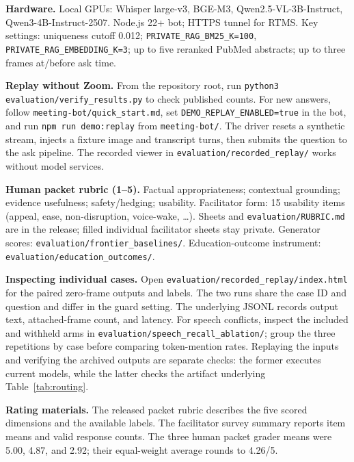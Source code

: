 \documentclass[11pt]{article}
\begin{document}
\textbf{Hardware.} Local GPUs: Whisper large-v3, BGE-M3, Qwen2.5-VL-3B-Instruct, Qwen3-4B-Instruct-2507. Node.js 22+ bot; HTTPS tunnel for RTMS. Key settings: uniqueness cutoff 0.012; \texttt{PRIVATE\_RAG\_BM25\_K=100}, \texttt{PRIVATE\_RAG\_EMBEDDING\_K=3}; up to five reranked PubMed abstracts; up to three frames at/before ask time.

\textbf{Replay without Zoom.} From the repository root, run \nolinkurl{python3 evaluation/verify_results.py} to check published counts. For new answers, follow \nolinkurl{meeting-bot/quick_start.md}, set \texttt{DEMO\_REPLAY\_ENABLED=true} in the bot, and run \texttt{npm run demo:replay} from \texttt{meeting-bot/}. The driver resets a synthetic stream, injects a fixture image and transcript turns, then submits the question to the ask pipeline. The recorded viewer in \nolinkurl{evaluation/recorded_replay/} works without model services.

\textbf{Human packet rubric (1--5).} Factual appropriateness; contextual grounding; evidence usefulness; safety/hedging; usability. Facilitator form: 15 usability items (appeal, ease, non-disruption, voice-wake, \ldots). Sheets and \nolinkurl{evaluation/RUBRIC.md} are in the release; filled individual facilitator sheets stay private. Generator scores: \nolinkurl{evaluation/frontier\_baselines/}. Education-outcome instrument: \nolinkurl{evaluation/education\_outcomes/}.

\newpage\textbf{Inspecting individual cases.} Open \nolinkurl{evaluation/recorded_replay/index.html} for the paired zero-frame outputs and labels. The two runs share the case ID and question and differ in the guard setting. The underlying JSONL records output text, attached-frame count, and latency. For speech conflicts, inspect the included and withheld arms in \nolinkurl{evaluation/speech_recall_ablation/}; group the three repetitions by case before comparing token-mention rates. Replaying the inputs and verifying the archived outputs are separate checks: the former executes current models, while the latter checks the artifact underlying Table~\ref{tab:routing}.

\textbf{Rating materials.} The released packet rubric describes the five scored dimensions and the available labels. The facilitator survey summary reports item means and valid response counts. The three human packet grader means were 5.00, 4.87, and 2.92; their equal-weight average rounds to 4.26/5.
\end{document}
